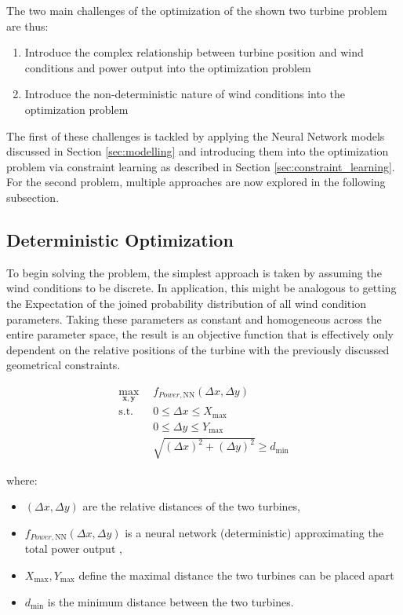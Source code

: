 The two main challenges of the optimization of the shown two turbine problem are thus: 

\begin{enumerate}
	\item Introduce the complex relationship between turbine position and wind conditions and power output into the optimization problem
	\item Introduce the non-deterministic nature of wind conditions into the optimization problem
\end{enumerate}

The first of these challenges is tackled by applying the Neural Network models discussed in Section \ref{sec:modelling} and introducing them into the optimization problem via constraint learning as described in Section \ref{sec:constraint_learning}. For the second problem, multiple approaches are now explored in the following subsection.


\subsection{Deterministic Optimization}

To begin solving the problem, the simplest approach is taken by assuming the wind conditions to be discrete. In application, this might be analogous to getting the Expectation of the joined probability distribution of all wind condition parameters. Taking these parameters as constant and homogeneous across the entire parameter space, the result is an objective function that is effectively only dependent on the relative positions of the turbine with the previously discussed geometrical constraints.

\begin{align}
	\max_{\mathbf{x}, \mathbf{y}} & f_{Power,\text{NN}}(\Delta x, \Delta y) \\
	\text{s.t.} \quad 
	&  0 \leq \Delta x \leq X_{\max} \\
	&  0 \leq \Delta y \leq Y_{\max} \\
	& \sqrt{(\Delta x)^2 + (\Delta y)^2} \geq d_{\min}
\end{align}

where:
\begin{itemize}
	\item \( (\Delta x, \Delta y) \) are the relative distances of the two turbines,
	\item \( f_{Power, \text{NN}}(\Delta x, \Delta y)\) is a neural network (deterministic) approximating the total power output ,
	\item \(  X_{\max}, Y_{\max} \) define the maximal distance the two turbines can be placed apart
	\item \( d_{\min} \) is the minimum distance between the two turbines.
\end{itemize}


